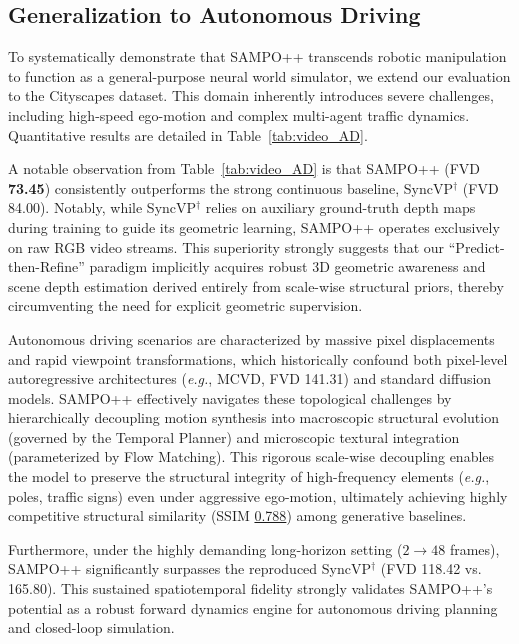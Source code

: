 \subsection{Generalization to Autonomous Driving}

To systematically demonstrate that SAMPO++ transcends robotic manipulation to function as a general-purpose neural world simulator, we extend our evaluation to the Cityscapes dataset. This domain inherently introduces severe challenges, including high-speed ego-motion and complex multi-agent traffic dynamics. Quantitative results are detailed in Table~\ref{tab:video_AD}.

A notable observation from Table~\ref{tab:video_AD} is that SAMPO++ (FVD \textbf{73.45}) consistently outperforms the strong continuous baseline, SyncVP$^{\dagger}$ (FVD 84.00). Notably, while SyncVP$^{\dagger}$ relies on auxiliary ground-truth depth maps during training to guide its geometric learning, SAMPO++ operates exclusively on raw RGB video streams. This superiority strongly suggests that our ``Predict-then-Refine'' paradigm implicitly acquires robust 3D geometric awareness and scene depth estimation derived entirely from scale-wise structural priors, thereby circumventing the need for explicit geometric supervision.


% 
Autonomous driving scenarios are characterized by massive pixel displacements and rapid viewpoint transformations, which historically confound both pixel-level autoregressive architectures (\textit{e.g.}, MCVD, FVD 141.31) and standard diffusion models. SAMPO++ effectively navigates these topological challenges by hierarchically decoupling motion synthesis into macroscopic structural evolution (governed by the Temporal Planner) and microscopic textural integration (parameterized by Flow Matching). This rigorous scale-wise decoupling enables the model to preserve the structural integrity of high-frequency elements (\textit{e.g.}, poles, traffic signs) even under aggressive ego-motion, ultimately achieving highly competitive structural similarity (SSIM \underline{0.788}) among generative baselines.

Furthermore, under the highly demanding long-horizon setting ($2 \rightarrow 48$ frames), SAMPO++ significantly surpasses the reproduced SyncVP$^{\dagger}$ (FVD 118.42 vs. 165.80). This sustained spatiotemporal fidelity strongly validates SAMPO++'s potential as a robust forward dynamics engine for autonomous driving planning and closed-loop simulation.

